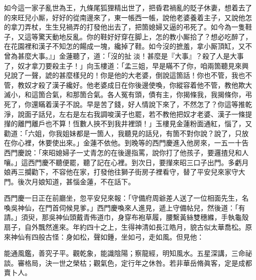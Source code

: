 如今這一家子亂世為王，九條尾狐狸精出世了，把昏君禍亂的貶子休妻，想着去了的來旺兒小厮，好好的從南邊來了，東一帳西一帳，說他老婆養着主子，又說他怎的拿刀弄杖，生生兒禍弄的打發他出去了，把箇媳婦又逼的弔死了。如今為一隻鞋子，又這等驚天動地反亂。你的鞋好好穿在脚上，怎的教小厮拾了？想必吃醉了，在花園裡和漢子不知怎的餳成一塊，纔掉了鞋。如今沒的摭羞，拿小厮頂缸，{}又不曾為甚麼大事。』」金蓮聽了，道：「沒的扯𣭈淡！甚麼是『大事』？殺了人是大事了，奴才拿刀要殺主子！」向玉樓道：「孟三姐，早是瞞不了你，咱兩箇聽見來興兒說了一聲，諕的甚麼樣兒的！你是他的大老婆，倒說這箇話！你也不管，我也不管，教奴才殺了漢子纔好。他老婆成日在你後邊使喚，你縱容着他不管，教他欺大滅小，和這箇合氣，和那箇合氣。各人冤有頭，債有主，你揭條我，我揭條你，弔死了，你還瞞着漢子不說。早是苦了錢，好人情說下來了，不然怎了？{}你這等推乾淨，說面子話兒，左右是左右我調唆漢子也罷，若不教他把奴才老婆、漢子一條提攆的離門離戶也不算！恆數人挾不到我井裡頭！」玉樓見金蓮粉面通紅，惱了，又勸道：「六姐，你我姐妹都是一箇人，我聽見的話兒，有箇不對你說？說了，只放在你心裡，休要使出來。」{}金蓮不依他。到晚等的西門慶進入他房來，一五一十告西門慶說：「來昭媳婦子一丈青怎的在後邊指罵，說你打了他孩子，要邏揸兒和人嚷。」這西門慶不聽便罷，聽了記在心裡。到次日，要攆來昭三口子出門。多虧月娘再三攔勸下，不容他在家，打發他往獅子街房子裡看守，替了平安兒來家守大門。後次月娘知道，甚惱金蓮，不在話下。

西門慶一日正在前廳坐，忽平安兒來報：「守備府周爺差人送了一位相面先生，名喚吳神仙，在門首伺候見爹。」西門慶喚來人進見，遞上守備帖兒，然後道：「有請。」須臾，那吳神仙頭戴青佈道巾，身穿布袍草履，腰繫黃絲雙穗縧，手執龜殼扇子，自外飄然進來。年約四十之上，生得神清如長江皓月，貌古似太華喬松。原來神仙有四般古怪：身如松，聲如鍾，坐如弓，走如風。但見他：

\begin{myquote}
能通風鑑，善究子平。觀乾象，能識陰陽；察龍經，明知風水。五星深講，三命祕談。審格局，決一世之榮枯；觀氣色，定行年之休咎。若非華岳脩眞客，定是成都賣卜人。
\end{myquote}

